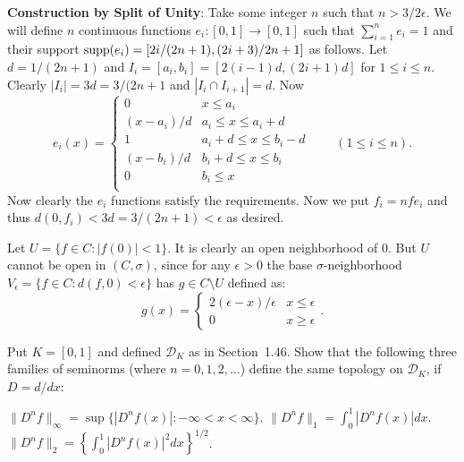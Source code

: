 \begin{enumerate}
\begin{itemize}
   \textbf{Construction by Split of Unity}:\newline
   Take some integer $n$ such that \(n > 3/2\epsilon\).
   We will define $n$ continuous functions 
   \(e_i: [0,1] \rightarrow [0,1]\) such that 
   \(\sum_{i=1}^n e_i = 1\) and 
   their support  \(\mathop{\rm supp}\nolimits(e_i) = [2i/(2n+1),(2i+3)/2n+1]\) as follows.
   Let \(d = 1/(2n+1)\) and \(I_i = [a_i,b_i] = [2(i-1)d, (2i+1)d]\)
   for \(1\leq i \leq n\).
   Clearly \(|I_i| = 3d = 3/(2n+1\) and \(|I_i \cap I_{i+1}| = d\).
   Now
   \begin{equation*}
     e_i(x) = \left\{\begin{array}{ll}
                     0          & x  \leq a_i \\
                     (x-a_i)/d  & a_i   \leq x \leq a_i + d \\
                     1          & a_i+d \leq x \leq b_i - d \\
                     (x-b_i)/d  & b_i+d \leq x \leq b_i \\
                     0          & b_i \leq x \\
                     \end{array}\right. \qquad (1\leq i \leq n).
   \end{equation*}
   Now clearly the \(e_i\) functions satisfy the requirements.
   Now we put \(f_i = n f e_i\) and 
   thus \(d(0,f_i) < 3d = 3/(2n+1) < \epsilon\) as desired.

   

   Let \(U=\{f\in C: |f(0)| < 1\}\). It is clearly 
   an open neighborhood of $0$.
   But $U$ cannot be open in \((C,\sigma)\), since for any \(\epsilon>0\)
   the base \(\sigma\)-neighborhood
   \(V_\epsilon = \{f\in C: d(f,0)<\epsilon\}\)
   has \(g\in C\setminus U\) defined as:
   \begin{equation*}
   g(x) = \left\{\begin{array}{ll}
                2(\epsilon-x)/\epsilon & x \leq \epsilon \\
                0                      & x \geq \epsilon 
                \end{array}\right. .
   \end{equation*}
\end{itemize}

\begin{excopy}
Put \(K=[0,1]\) and defined \(\mathcal{D}_K\) as in Section~1.46.
Show that the following three families of seminorms (where \(n=0,1,2,\ldots\))
define the same topology on \(\mathcal{D}_K\), 
if \(D = d/dx\):
\begin{itemize}
  \(\|D^n f\|_\infty = \sup\{|D^n f(x)|: -\infty < x < \infty\}\).
  \(\|D^n f\|_1  = \int_0^1 |D^n f(x)|dx\).
  \(\|D^n f\|_2  = \left\{\int_0^1 |D^n f(x)|^2dx\right\}^{1/2}\).
\end{itemize}
\end{excopy}


\end{enumerate}
